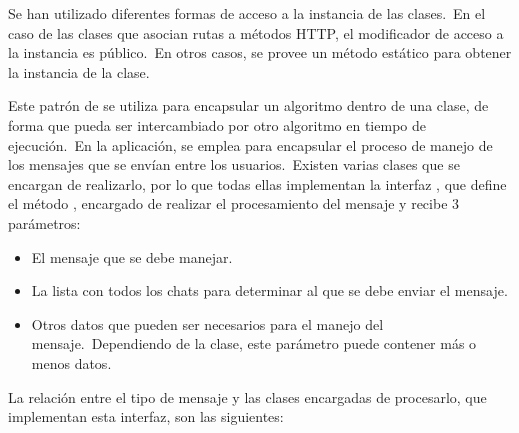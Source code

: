 Se han utilizado diferentes formas de acceso a la instancia de las clases.\ En el caso de las clases que asocian rutas a
métodos HTTP, el modificador de acceso a la instancia es público.\ En otros casos, se provee un método estático para
obtener la instancia de la clase.

Este patrón de  se utiliza para encapsular un algoritmo dentro de una clase, de forma que
pueda ser intercambiado por otro algoritmo en tiempo de ejecución.\ En la aplicación, se emplea para encapsular el
proceso de manejo de los mensajes que se envían entre los usuarios.\ Existen varias clases que se encargan de
realizarlo, por lo que todas ellas implementan la interfaz , que define el método
, encargado de realizar el procesamiento del mensaje y recibe 3 parámetros:

\begin{itemize}
	\item El mensaje que se debe manejar.
	\item La lista con todos los chats para determinar al que se debe enviar el mensaje.
	\item Otros datos que pueden ser necesarios para el manejo del mensaje.\ Dependiendo de la clase, este parámetro
	puede contener más o menos datos.
\end{itemize}
\label{itm:parametershandlestrategy}

La relación entre el tipo de mensaje y las clases encargadas de procesarlo, que implementan esta interfaz, son las
siguientes:

